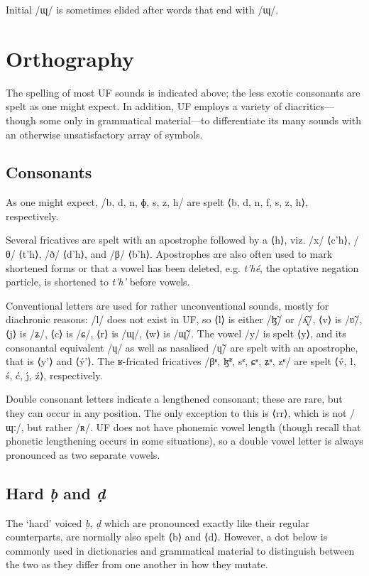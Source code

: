 \documentclass[a4paper, 12pt, twoside, openright, final]{book}
\let \w \textit
\begin{document}
Initial /ɰ/ is sometimes elided after words that end with /ɰ/.

\section{Orthography}
The spelling of most UF sounds is indicated above; the less exotic consonants are spelt as
one might expect. In addition, UF employs a variety of diacritics—though some only in grammatical
material—to differentiate its many sounds with an otherwise unsatisfactory array of symbols.

\subsection{Consonants}
As one might expect, /b, d, n, ɸ, s, z, h/ are spelt ⟨b, d, n, f, s, z, h⟩, respectively.

Several fricatives are spelt with an apostrophe followed by a ⟨h⟩, viz. /x/ ⟨c’h⟩, /θ/ ⟨t’h⟩, /ð/ ⟨d’h⟩,
and /β/ ⟨b’h⟩. Apostrophes are also often used to mark shortened forms or that a vowel has been deleted, e.g. \w{t’hé},
the optative negation particle, is shortened to \w{t’h’} before vowels.

Conventional letters are used for rather unconventional sounds, mostly for diachronic reasons:
/l/ does not exist in UF, so ⟨l⟩ is either /ɮ̃/ or /ʎ̝̃/, ⟨v⟩ is /ʋ̃/, ⟨j⟩ is /ʑ/, ⟨c⟩ is /ɕ/, ⟨r⟩ is /ɰ/, ⟨w⟩ is /ɰ̃/. The vowel
/y/ is spelt ⟨y⟩, and its consonantal equivalent /ɥ/ as well as nasalised /ɥ̃/ are spelt with an apostrophe, that is
⟨y’⟩ and ⟨ý’⟩. The ʁ-fricated fricatives /βʶ, ɮ̃ʶ, sʶ, ɕʶ, ʑʶ, zʶ/
are spelt ⟨v́, ł, ś, ć, ȷ́, ź⟩, respectively.

Double consonant letters indicate a lengthened consonant; these are rare, but they can occur in any position. The only
exception to this is ⟨rr⟩, which is not /ɰː/, but rather /ʀ/. UF does not have phonemic vowel length (though recall
that phonetic lengthening occurs in some situations), so a double vowel letter is always pronounced as two separate vowels.

\subsection{Hard \textit{ḅ} and \textit{ḍ}}
The ‘hard’ voiced \w{ḅ}, \w{ḍ} which are pronounced exactly like their regular counterparts, are normally also spelt ⟨b⟩ and
⟨d⟩. However, a dot below is commonly used in dictionaries and grammatical material to distinguish between the two
as they differ from one another in how they mutate.
\end{document}
